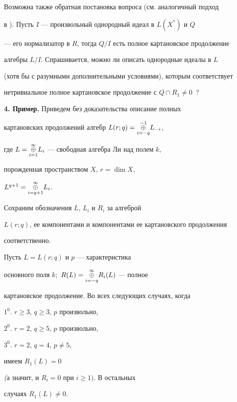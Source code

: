 Возможна также обратная постановка вопроса (см. аналогичный подход


в \cite{Kan}). Пусть $I$ --- произвольный однородный идеал в $L(X^*)$ и $Q$


--- его нормализатор в $R$, тогда $Q/I$ есть полное картановское продолжение


алгебры $L/I$. Спрашивается, можно ли описать однородные идеалы в $L$


(хотя бы с разумными дополнительными условиями), которым соответствует


нетривиальное полное картановское продолжение с $Q\cap R_1 \ne 0$~?


\medskip





{\bf 4. Пример.} Приведем без доказательства описание полных


картановских продолжений алгебр $L(r;q)=\underset{i=-q}{\overset{-1}{\oplus}}{}L_{-i}$,


где $L=\underset{i=1}{\overset{\infty }{\oplus}}{} L_i$ --- свободная алгебра Ли над полем $k$,


порожденная пространством $X$, $r=\dim X$,


$L^{q+1}=\underset{i=q+1}{\overset{\infty }{\oplus}}{}L_i$.


Сохраним обозначения $L$, $L_i$ и $R_i$ за алгеброй


$L(r;q)$, ее компонентами и компонентами ее картановского продолжения


соответственно.





\begin{thm} Пусть $L=L(r;q)$ и $p$ --- характеристика


основного поля $k;$ $R(L)=\underset{i=-q}{\overset{\infty }{\oplus}}{}R_i(L)$ --- полное


картановское продолжение. Во всех следующих случаях, когда





$1^0$. $r\ge 3$, $q\ge 3$, $p$ произвольно,





$2^0$. $r=2$, $q\ge 5$, $p$ произвольно,





$3^0$. $r=2$, $q=4$, $p\ne 5$,





\noindent имеем $R_1(L)=0$


{\em (}а значит, и $R_i=0$ при $i\ge 1)$. В остальных


случаях $R_1(L)\ne 0$.


\end{thm}





